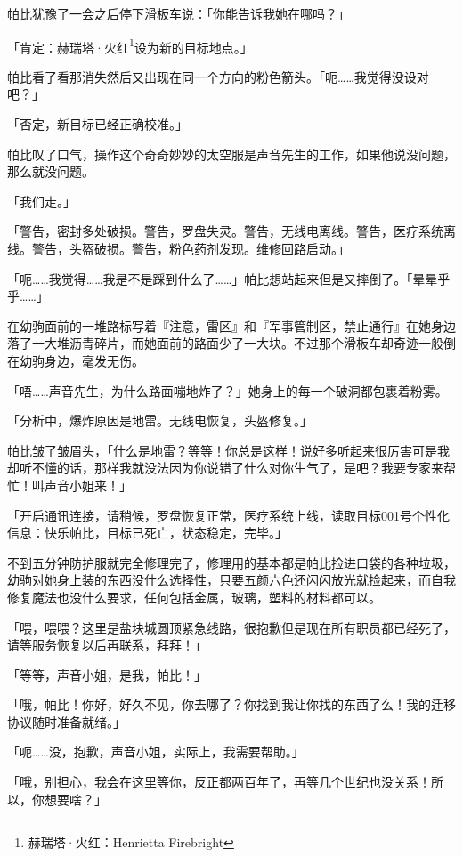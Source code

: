 帕比犹豫了一会之后停下滑板车说：「你能告诉我她在哪吗？」

「{\mt 肯定：赫瑞塔·火红\footnote{赫瑞塔·火红：Henrietta Firebright}设为新的目标地点。}」

帕比看了看那消失然后又出现在同一个方向的粉色箭头。「呃……我觉得没设对吧？」

「{\mt 否定，新目标已经正确校准。}」

帕比叹了口气，操作这个奇奇妙妙的太空服是声音先生的工作，如果他说没问题，那么就没问题。

「我们走。」

\horizonline


「{\mt 警告，密封多处破损。警告，罗盘失灵。警告，无线电离线。警告，医疗系统离线。警告，头盔破损。警告，粉色药剂发现。维修回路启动。}」

「呃……我觉得……我是不是踩到什么了……」帕比想站起来但是又摔倒了。「晕晕乎乎……」

在幼驹面前的一堆路标写着『注意，雷区』和『军事管制区，禁止通行』在她身边落了一大堆沥青碎片，而她面前的路面少了一大块。不过那个滑板车却奇迹一般倒在幼驹身边，毫发无伤。

「唔……声音先生，为什么路面嘣地炸了？」她身上的每一个破洞都包裹着粉雾。

「{\mt 分析中，爆炸原因是地雷。无线电恢复，头盔修复。}」

帕比皱了皱眉头，「什么是地雷？等等！你总是这样！说好多听起来很厉害可是我却听不懂的话，那样我就没法因为你说错了什么对你生气了，是吧？我要专家来帮忙！叫声音小姐来！」

「{\mt 开启通讯连接，请稍候，罗盘恢复正常，医疗系统上线，读取目标001号个性化信息：快乐帕比，目标已死亡，状态稳定，完毕。}」

不到五分钟防护服就完全修理完了，修理用的基本都是帕比捡进口袋的各种垃圾，幼驹对她身上装的东西没什么选择性，只要五颜六色还闪闪放光就捡起来，而自我修复魔法也没什么要求，任何包括金属，玻璃，塑料的材料都可以。

「喂，喂喂？这里是盐块城圆顶紧急线路，很抱歉但是现在所有职员都已经死了，请等服务恢复以后再联系，拜拜！」

「等等，声音小姐，是我，帕比！」

「哦，帕比！你好，好久不见，你去哪了？你找到我让你找的东西了么！我的迁移协议随时准备就绪。」

「呃……没，抱歉，声音小姐，实际上，我需要帮助。」

「哦，别担心，我会在这里等你，反正都两百年了，再等几个世纪也没关系！所以，你想要啥？」

